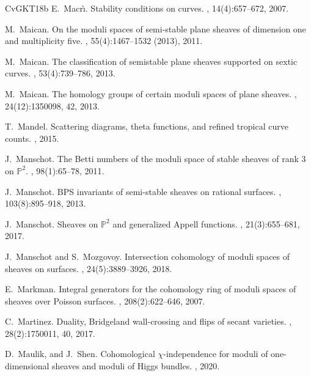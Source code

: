\documentclass[12pt, a4paper]{amsart}
\begin{document}
\begin{thebibliography}{CvGKT18b}
E.~Macr\`\i.
\newblock Stability conditions on curves.
, 14(4):657--672, 2007.

M.~Maican.
\newblock On the moduli spaces of semi-stable plane sheaves of dimension one
  and multiplicity five.
, 55(4):1467--1532 (2013), 2011.

M.~Maican.
\newblock The classification of semistable plane sheaves supported on sextic
  curves.
, 53(4):739--786, 2013.

M.~Maican.
\newblock The homology groups of certain moduli spaces of plane sheaves.
, 24(12):1350098, 42, 2013.

T.~Mandel.
\newblock Scattering diagrams, theta functions, and refined tropical curve
  counts.
, 2015.

J.~Manschot.
\newblock The {B}etti numbers of the moduli space of stable sheaves of rank 3
  on {$\mathbb{P}^2$}.
, 98(1):65--78, 2011.

J.~Manschot.
\newblock B{PS} invariants of semi-stable sheaves on rational surfaces.
, 103(8):895--918, 2013.


J.~Manschot.
\newblock Sheaves on {$\mathbb{P}^2$} and generalized {A}ppell functions.
, 21(3):655--681, 2017.

J.~Manschot and S.~Mozgovoy.
\newblock Intersection cohomology of moduli spaces of sheaves on surfaces.
, 24(5):3889--3926, 2018.

E.~Markman.
\newblock Integral generators for the cohomology ring of moduli spaces of
  sheaves over {P}oisson surfaces.
, 208(2):622--646, 2007.

C.~Martinez.
\newblock Duality, {B}ridgeland wall-crossing and flips of secant varieties.
, 28(2):1750011, 40, 2017.


D.~Maulik, and J.~Shen.
\newblock Cohomological $\chi $-independence for moduli of one-dimensional sheaves and moduli of Higgs bundles.
, 2020.


\end{thebibliography}
\end{document}
